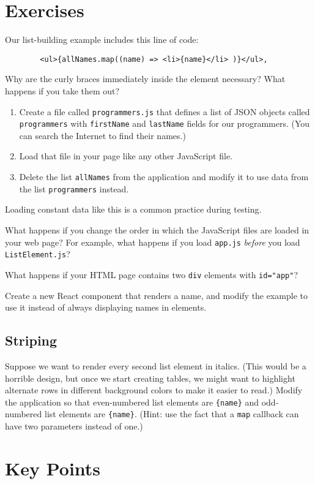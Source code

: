 \section{Exercises}\label{s:dynamic-exercises}


Our list-building example includes this line of code:

\begin{verbatim}
        <ul>{allNames.map((name) => <li>{name}</li> )}</ul>,
\end{verbatim}

Why are the curly braces immediately inside the \texttt{} element necessary?
What happens if you take them out?


\begin{enumerate}
\item
  Create a file called \texttt{programmers.js} that defines
  a list of JSON objects called \texttt{programmers}
  with \texttt{firstName} and \texttt{lastName} fields for our programmers.
  (You can search the Internet to find their names.)
\item
  Load that file in your page like any other JavaScript file.
\item
  Delete the list \texttt{allNames} from the application
  and modify it to use data from the list \texttt{programmers} instead.
\end{enumerate}

Loading constant data like this is a common practice during testing.


What happens if you change the order in which the JavaScript files
are loaded in your web page?
For example,
what happens if you load \texttt{app.js} \emph{before} you load \texttt{ListElement.js}?


What happens if your HTML page contains two \texttt{div} elements with \texttt{id="app"}?


Create a new React component that renders a name,
and modify the example to use it instead of always displaying names in \texttt{} elements.

\subsection*{Striping}
Suppose we want to render every second list element in italics.
(This would be a horrible design,
but once we start creating tables,
we might want to highlight alternate rows in different background colors
to make it easier to read.)
Modify the application so that
even-numbered list elements are \texttt{\{name\}}
and odd-numbered list elements are \texttt{\{name\}}.
(Hint: use the fact that a \texttt{map} callback can have two parameters instead of one.)

\section*{Key Points}


